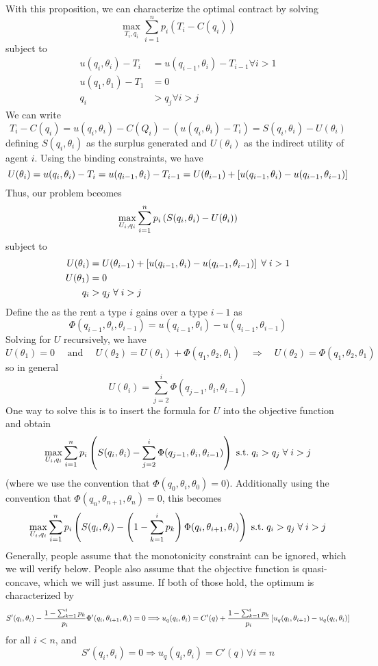 \documentclass[10pt]{article}
\begin{document}
With this proposition, we can characterize the optimal contract by solving\[\max_{T_i,q_i} \sum_{i=1}^n p_i(T_i - C(q_i))\]subject to \begin{align*} u(q_i,\theta_i) - T_i &= u(q_{i-1},\theta_i) - T_{i-1} \forall i > 1 \\ u(q_1,\theta_1)-T_1 &= 0 \\ q_i &> q_j \forall i > j\end{align*}We can write\[T_i - C(q_i) = u(q_i,\theta_i) - C(Q_i) - (u(q_i,\theta_i) - T_i) = S(q_i,\theta_i) - U(\theta_i)\]defining $S(q_i,\theta_i)$ as the surplus generated and $U(\theta_i)$ as the indirect utility of agent $i$. Using the binding constraints, we have\[U(\theta_i) = u(q_i,\theta_i) - T_i = u(q_{i-1},\theta_i) - T_{i-1} = U(\theta_{i-1}) + \left[ u(q_{i-1},\theta_i) - u(q_{i-1},\theta_{i-1})\right]\]Thus, our problem bceomes\[\max_{U_i,q_i} \sum_{i=1}^n p_i\left( S(q_i,\theta_i) - U(\theta_i)\right)\]subject to\begin{align*} U(\theta_i) &= U(\theta_{i-1}) + \barl u(q_{i-1},\theta_i) - u(q_{i-1},\theta_{i-1})\barr \forall i > 1 \\ U(\theta_1) &= 0 \\ q_i &> q_j \forall i > j\end{align*}Define the  as the rent a type $i$ gains over a type $i-1$ as\[\Phi(q_{i-1},\theta_i,\theta_{i-1}) = u(q_{i-1},\theta_i) - u(q_{i-1},\theta_{i-1})\]Solving for $U$ recursively, we have \[U(\theta_1) = 0 \quad \text{ and } \quad U(\theta_2) = U(\theta_1) + \Phi(q_1,\theta_2,\theta_1) \quad \Longrightarrow \quad U(\theta_2) = \Phi(q_1,\theta_2,\theta_1)\]so in general\[U(\theta_i) = \sum_{j=2}^i \Phi(q_{j-1},\theta_i,\theta_{i-1})\]One way to solve this is to insert the formula for $U$ into the objective function and obtain\[\max_{U_i,q_i} \sum_{i=1}^n p_i \parl S(q_i,\theta_i) - \sum_{j=2}^i \Phi(q_{j-1},\theta_i,\theta_{i-1})\parr \st q_i > q_j \forall i > j\](where we use the convention that $\Phi(q_0,\theta_i,\theta_0) = 0$). Additionally using the convention that $\Phi(q_n,\theta_{n+1},\theta_n) = 0$, this becomes \[\max_{U_i,q_i} \sum_{i=1}^n p_i \parl S(q_i,\theta_i) - \parl 1 - \sum_{k=1}^i p_k\parr \Phi(q_{i},\theta_{i+1},\theta_{i})\parr \st q_i > q_j \forall i > j\]Generally, people assume that the monotonicity constraint can be ignored, which we will verify below. People also assume that the objective function is quasi-concave, which we will just assume. If both of those hold, the optimum is characterized by\[S'(q_i,\theta_i) - \frac{1 - \sum_{k=1}^i p_k}{p_i} \Phi'(q_i,\theta_{i+1},\theta_i) = 0 \Longrightarrow u_q(q_i,\theta_i) = C'(q) + \frac{1- \sum_{k=1}^i p_k}{p_i}\left[ u_q(q_i,\theta_{i+1})-u_q(q_i,\theta_i)\right]\]for all $i < n$, and\[S'(q_i,\theta_i) = 0 \Longrightarrow u_q(q_i,\theta_i) = C'(q) \forall i = n\]
\end{document}
